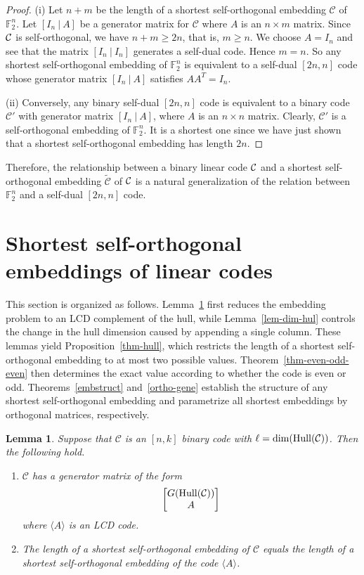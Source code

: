 \documentclass{article}
\newtheorem{lemma}[theorem]{Lemma}
\theoremstyle{definition}
\theoremstyle{remark}
\newcommand{\C}{\mbox{$\cal C$}}
\begin{document}
\begin{proof}
(i) Let $n+m$ be the length of a shortest self-orthogonal embedding $\mathcal C$ of $\mathbb F_2^n$.  Let $[I_n~|~A]$ be a generator matrix for $\mathcal C$ where $A$ is an $n \times m$ matrix. Since $\C$ is self-orthogonal, we have $n+m \ge 2n$, that is, $m \ge n$.  We choose $A = I_n$ and see that the matrix $[I_n~|~I_n]$ generates a self-dual code. Hence $m=n$. So any shortest self-orthogonal embedding of $\mathbb F_2^n$ is equivalent to a self-dual $[2n, n]$ code whose generator matrix $[I_n~|~A]$ satisfies $AA^T=I_n$.

(ii) Conversely, any binary self-dual $[2n, n]$ code is equivalent to a binary code $\mathcal C'$ with generator matrix $[I_n~|~A]$, where $A$ is an $n \times n$ matrix. Clearly, $\mathcal C'$ is a self-orthogonal embedding of $\mathbb F_2^n$. It is a shortest one since we have just shown that a shortest self-orthogonal embedding has length $2n$.
\end{proof}

Therefore, the relationship between a binary linear code $\C$ and a shortest self-orthogonal embedding $\tilde{\mathcal{C}}$ of $\C$ is a natural generalization of the relation between $\mathbb F_2^n$ and a self-dual $[2n, n]$ code. 

\section{Shortest self-orthogonal embeddings of linear codes}\label{sec-main}

This section is organized as follows. Lemma~\ref{lem-length-equal} first reduces the embedding problem to an LCD complement of the hull, while Lemma~\ref{lem-dim-hul} controls the change in the hull dimension caused by appending a single column. These lemmas yield Proposition~\ref{thm-hull}, which restricts the length of a shortest self-orthogonal embedding to at most two possible values. Theorem~\ref{thm-even-odd-even} then determines the exact value according to whether the code is even or odd. Theorems~\ref{embstruct} and~\ref{ortho-gene} establish the structure of any shortest self-orthogonal embedding and parametrize all shortest embeddings by orthogonal matrices, respectively.

\begin{lemma} \label{lem-length-equal}
Suppose that $\mathcal C$ is an $[n, k]$ binary code with
$\ell =\dim({\rm{Hull}}(\mathcal C))$. Then the following hold.

\begin{enumerate}
\item[{(i)}] $\mathcal C$ has a generator matrix of the form
\[
\begin{bmatrix}
G(\mathcal {\rm{Hull}}(\mathcal C))  \\
A 
\end{bmatrix}
\]
where $\langle A\rangle$ is an LCD code.
\item[{(ii)}] The length of a shortest self-orthogonal embedding of $\mathcal C$ equals the length of a shortest self-orthogonal embedding of the code $\langle A\rangle$.

\end{enumerate}
\end{lemma}
\end{document}
